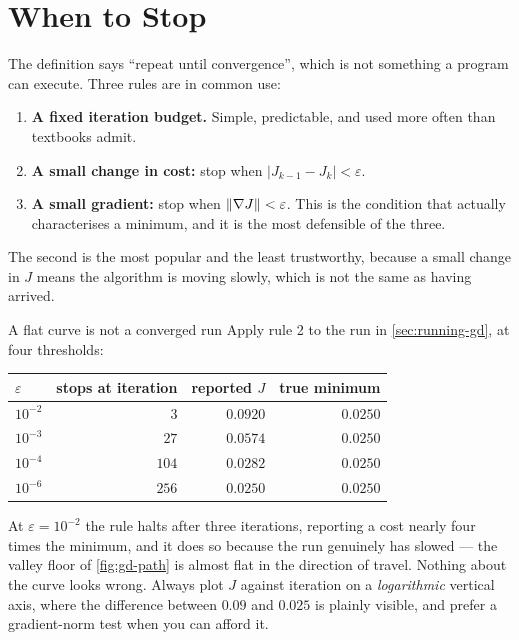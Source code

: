 \section{When to Stop}
\label{sec:stopping}

The definition says ``repeat until convergence'', which is not something a
program can execute. Three rules are in common use:

\begin{enumerate}
  \item \textbf{A fixed iteration budget.} Simple, predictable, and used more
        often than textbooks admit.
  \item \textbf{A small change in cost:} stop when
        $|J_{k-1} - J_k| < \varepsilon$.
  \item \textbf{A small gradient:} stop when $\|\nabla J\| < \varepsilon$. This
        is the condition that actually characterises a minimum, and it is the
        most defensible of the three.
\end{enumerate}

The second is the most popular and the least trustworthy, because a small change
in $J$ means the algorithm is moving slowly, which is not the same as having
arrived.

\begin{pitfall}{A flat curve is not a converged run}
Apply rule 2 to the run in \cref{sec:running-gd}, at four thresholds:

\begin{center}
\small
\begin{tabular}{@{}lrrr@{}}
\toprule
$\varepsilon$ & stops at iteration & reported $J$ & true minimum\\
\midrule
$10^{-2}$ & $3$   & $0.0920$ & $0.0250$\\
$10^{-3}$ & $27$  & $0.0574$ & $0.0250$\\
$10^{-4}$ & $104$ & $0.0282$ & $0.0250$\\
$10^{-6}$ & $256$ & $0.0250$ & $0.0250$\\
\bottomrule
\end{tabular}
\end{center}

At $\varepsilon = 10^{-2}$ the rule halts after three iterations, reporting a
cost nearly four times the minimum, and it does so because the run genuinely has
slowed --- the valley floor of \cref{fig:gd-path} is almost flat in the
direction of travel. Nothing about the curve looks wrong. Always plot $J$
against iteration on a \emph{logarithmic} vertical axis, where the difference
between $0.09$ and $0.025$ is plainly visible, and prefer a gradient-norm test
when you can afford it.
\end{pitfall}

